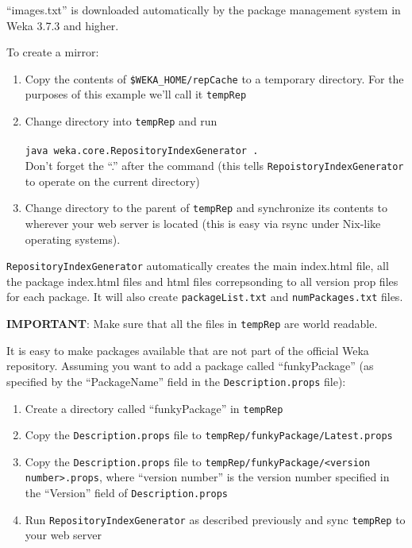 ``images.txt'' is downloaded automatically by the package management
system in Weka 3.7.3 and higher.

To create a mirror:

\begin{enumerate}
\item Copy the contents of \verb=$WEKA_HOME/repCache= to a temporary
  directory. For the purposes of this example we'll call it
  \texttt{tempRep}
\item Change directory into \texttt{tempRep} and run\\\\

\verb=java weka.core.RepositoryIndexGenerator .= \\

Don't forget the ``.'' after the command (this tells
\texttt{RepoistoryIndexGenerator} to operate on the current directory)

\item Change directory to the parent of \texttt{tempRep} and synchronize its
contents to wherever your web server is located (this is easy via rsync under
Nix-like operating systems).
\end{enumerate}

\texttt{RepositoryIndexGenerator} automatically creates the main
index.html file, all the package index.html files and html files
correpsonding to all version prop files for each package. It will also
create \texttt{packageList.txt} and \texttt{numPackages.txt} files.

\textbf{IMPORTANT}: Make sure that all the files in \texttt{tempRep}
are world readable.

It is easy to make packages available that are not part of the
official Weka repository. Assuming you want to add a package called
``funkyPackage'' (as specified by the
``PackageName'' field in the \texttt{Description.props} file):

\begin{enumerate}
\item Create a directory called ``funkyPackage'' in \texttt{tempRep}
\item Copy the \texttt{Description.props} file to \texttt{tempRep/funkyPackage/Latest.props}
\item Copy the \texttt{Description.props} file to \texttt{tempRep/funkyPackage/<version number>.props}, where ``version number'' is the version number specified in the ``Version'' field of \texttt{Description.props}
\item Run \texttt{RepositoryIndexGenerator} as described previously and sync \texttt{tempRep} to your web server
\end{enumerate}

